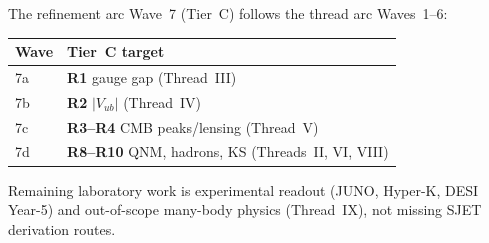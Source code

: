 \begin{remark}
\label{rmk:tierc-programme-complete}
The refinement arc Wave~7 (Tier~C) follows the thread arc Waves~1--6:
\begin{center}
\small
\begin{tabular}{@{}ll@{}}
\toprule
\textbf{Wave} & \textbf{Tier~C target} \\
\midrule
7a & \textbf{R1} gauge gap (Thread~III) \\
7b & \textbf{R2} $|V_{ub}|$ (Thread~IV) \\
7c & \textbf{R3--R4} CMB peaks/lensing (Thread~V) \\
7d & \textbf{R8--R10} QNM, hadrons, KS (Threads~II, VI, VIII) \\
\bottomrule
\end{tabular}
\end{center}
Remaining laboratory work is experimental readout (JUNO, Hyper-K, DESI Year-5)
and out-of-scope many-body physics (Thread~IX), not missing SJET derivation
routes.
\end{remark}